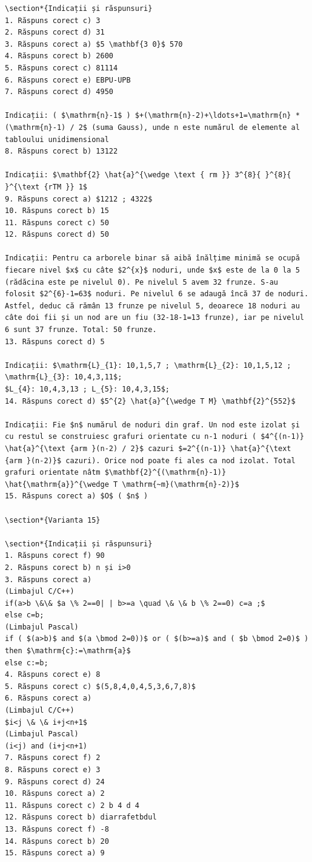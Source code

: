 \documentclass[10pt]{article}
\begin{document}
\begin{verbatim}
\section*{Indicații și răspunsuri}
1. Răspuns corect c) 3
2. Răspuns corect d) 31
3. Răspuns corect a) $5 \mathbf{3 0}$ 570
4. Răspuns corect b) 2600
5. Răspuns corect c) 81114
6. Răspuns corect e) EBPU-UPB
7. Răspuns corect d) 4950

Indicații: ( $\mathrm{n}-1$ ) $+(\mathrm{n}-2)+\ldots+1=\mathrm{n} *(\mathrm{n}-1) / 2$ (suma Gauss), unde n este numărul de elemente al tabloului unidimensional
8. Răspuns corect b) 13122

Indicații: $\mathbf{2} \hat{a}^{\wedge \text { rm }} 3^{8}{ }^{8}{ }^{\text {rTM }} 1$
9. Răspuns corect a) $1212 ; 4322$
10. Răspuns corect b) 15
11. Răspuns corect c) 50
12. Răspuns corect d) 50

Indicații: Pentru ca arborele binar să aibă înălțime minimă se ocupă fiecare nivel $x$ cu câte $2^{x}$ noduri, unde $x$ este de la 0 la 5 (rădăcina este pe nivelul 0). Pe nivelul 5 avem 32 frunze. S-au folosit $2^{6}-1=63$ noduri. Pe nivelul 6 se adaugă încă 37 de noduri. Astfel, deduc că rămân 13 frunze pe nivelul 5, deoarece 18 noduri au câte doi fii și un nod are un fiu (32-18-1=13 frunze), iar pe nivelul 6 sunt 37 frunze. Total: 50 frunze.
13. Răspuns corect d) 5

Indicații: $\mathrm{L}_{1}: 10,1,5,7 ; \mathrm{L}_{2}: 10,1,5,12 ; \mathrm{L}_{3}: 10,4,3,11$;
$L_{4}: 10,4,3,13 ; L_{5}: 10,4,3,15$;
14. Răspuns corect d) $5^{2} \hat{a}^{\wedge T M} \mathbf{2}^{552}$

Indicații: Fie $n$ numărul de noduri din graf. Un nod este izolat și cu restul se construiesc grafuri orientate cu n-1 noduri ( $4^{(n-1)} \hat{a}^{\text {arm }(n-2) / 2}$ cazuri $=2^{(n-1)} \hat{a}^{\text {arm }(n-2)}$ cazuri). Orice nod poate fi ales ca nod izolat. Total grafuri orientate nâtm $\mathbf{2}^{(\mathrm{n}-1)} \hat{\mathrm{a}}^{\wedge T \mathrm{~m}(\mathrm{n}-2)}$
15. Răspuns corect a) $O$ ( $n$ )

\section*{Varianta 15}

\section*{Indicații și răspunsuri}
1. Răspuns corect f) 90
2. Răspuns corect b) n și i>0
3. Răspuns corect a)
(Limbajul C/C++)
if(a>b \&\& $a \% 2==0| | b>=a \quad \& \& b \% 2==0) c=a ;$
else c=b;
(Limbajul Pascal)
if ( $(a>b)$ and $(a \bmod 2=0))$ or ( $(b>=a)$ and ( $b \bmod 2=0)$ )
then $\mathrm{c}:=\mathrm{a}$
else c:=b;
4. Răspuns corect e) 8
5. Răspuns corect c) $(5,8,4,0,4,5,3,6,7,8)$
6. Răspuns corect a)
(Limbajul C/C++)
$i<j \& \& i+j<n+1$
(Limbajul Pascal)
(i<j) and (i+j<n+1)
7. Răspuns corect f) 2
8. Răspuns corect e) 3
9. Răspuns corect d) 24
10. Răspuns corect a) 2
11. Răspuns corect c) 2 b 4 d 4
12. Răspuns corect b) diarrafetbdul
13. Răspuns corect f) -8
14. Răspuns corect b) 20
15. Răspuns corect a) 9


\end{verbatim}
\end{document}
